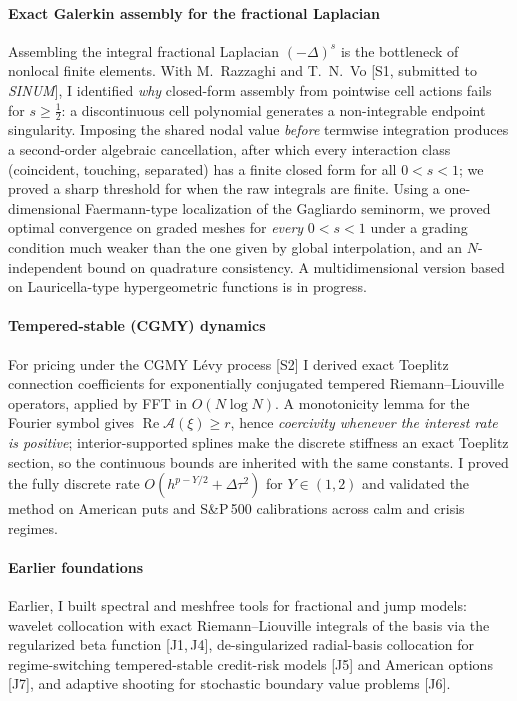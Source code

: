 \documentclass[11pt]{article}
\newcommand{\rc}[1]{\textcolor{accent}{[#1]}}
\begin{document}
\paragraph{Exact Galerkin assembly for the fractional Laplacian}
Assembling the integral fractional Laplacian $(-\Delta)^s$ is the bottleneck of
nonlocal finite elements. With M.~Razzaghi and T.~N.~Vo \rc{S1, submitted to
\emph{SINUM}}, I identified \emph{why} closed-form assembly from pointwise cell
actions fails for $s\ge\tfrac12$: a discontinuous cell polynomial generates a
non-integrable endpoint singularity. Imposing the shared nodal value \emph{before}
termwise integration produces a second-order algebraic cancellation, after
which every interaction class (coincident, touching, separated) has a finite
closed form for all $0<s<1$; we proved a sharp threshold for when the raw
integrals are finite. Using a one-dimensional Faermann-type localization of the
Gagliardo seminorm, we proved optimal convergence on graded meshes for
\emph{every} $0<s<1$ under a grading condition much weaker than the one given by global interpolation, and
an $N$-independent bound on quadrature consistency. A multidimensional version
based on Lauricella-type hypergeometric functions is in progress. %

\paragraph{Tempered-stable (CGMY) dynamics}
For pricing under the CGMY L\'evy process \rc{S2} I derived exact Toeplitz
connection coefficients for exponentially conjugated tempered Riemann--Liouville
operators, applied by FFT in $O(N\log N)$. A monotonicity lemma for the Fourier
symbol gives $\operatorname{Re}\mathcal A(\xi)\ge r$, hence \emph{coercivity
whenever the interest rate is positive}; interior-supported splines make the
discrete stiffness an exact Toeplitz section, so the continuous bounds are inherited
with the same constants. I proved the fully discrete rate
$O(h^{p-Y/2}+\Delta\tau^2)$ for $Y\in(1,2)$ and validated the method on
American puts and S\&P\,500 calibrations across calm and crisis regimes.

\paragraph{Earlier foundations}
Earlier, I built spectral and meshfree tools for fractional and jump models:
wavelet collocation with exact Riemann--Liouville integrals of the basis via the
regularized beta function \rc{J1,\,J4}, de-singularized radial-basis
collocation for regime-switching tempered-stable credit-risk models \rc{J5}
and American options \rc{J7}, and adaptive shooting for stochastic boundary
value problems \rc{J6}.
\end{document}
